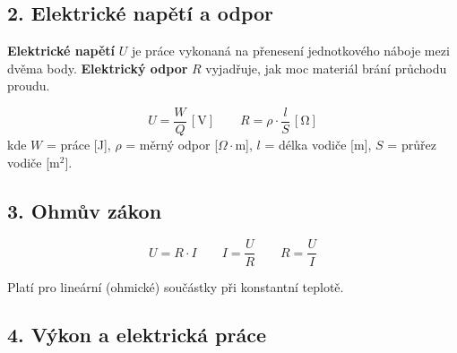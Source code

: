 \documentclass[a4paper,10pt]{article}
\newcommand{\jednotka}[1]{\,[\mathrm{#1}]}
\begin{document}
\begin{vysvetlenibox}
\subsection*{2. Elektrické napětí a odpor}

\textbf{Elektrické napětí} $U$ je práce vykonaná na přenesení jednotkového náboje mezi dvěma body.
\textbf{Elektrický odpor} $R$ vyjadřuje, jak moc materiál brání průchodu proudu.

\begin{vzorcebox}
\[
U = \frac{W}{Q} \jednotka{V}
\qquad
R = \rho \cdot \frac{l}{S} \jednotka{\Omega}
\]
kde $W$ = práce [J], $\rho$ = měrný odpor [$\Omega\cdot$m], $l$ = délka vodiče [m], $S$ = průřez vodiče [m$^2$].
\end{vzorcebox}

\subsection*{3. Ohmův zákon}

\begin{vzorcebox}
\[
U = R \cdot I
\qquad
I = \frac{U}{R}
\qquad
R = \frac{U}{I}
\]
\end{vzorcebox}

Platí pro lineární (ohmické) součástky při konstantní teplotě.

\medskip
\begin{center}
\end{center}

\subsection*{4. Výkon a elektrická práce}


\end{vysvetlenibox}
\end{document}

